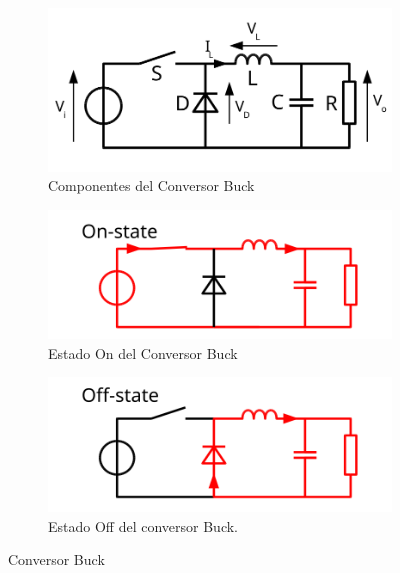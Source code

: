                 \begin{figure}[!ht]
                    \centering
                    \begin{subfigure}[b]{0.3\textwidth}
                        \centering
                        \includegraphics[width=\textwidth]{Imagenes/MPPT/Buck.jpg}
                        \caption{Componentes del Conversor Buck}
                        \label{fig:m1.1}
                    \end{subfigure}
                    \begin{subfigure}[b]{0.3\textwidth}
                        \centering
                        \includegraphics[width=\textwidth]{Imagenes/MPPT/Buck-On.jpg}
                        \caption{Estado On del Conversor Buck}
                        \label{fig:m1.2}
                    \end{subfigure}
                    \begin{subfigure}[b]{0.3\textwidth}
                        \centering
                        \includegraphics[width=\textwidth]{Imagenes/MPPT/Buck-Off.jpg}
                        \caption{Estado Off del conversor Buck.}
                        \label{fig:m1.3}
                    \end{subfigure}
                    \caption{Conversor Buck}
                    \label{fig:m1}
                \end{figure}

